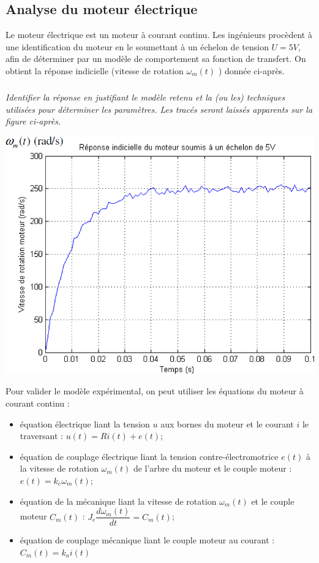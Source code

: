 \documentclass[10pt,fleqn]{article} %
\begin{document}
\begin{multicols}{2}
\subsection*{Analyse du moteur électrique}
Le moteur électrique est un moteur à courant continu. Les ingénieurs procèdent à une identification du
moteur en le soumettant à un échelon de tension $U=5V$, afin de déterminer par un modèle de
comportement sa fonction de transfert. On obtient la réponse indicielle (vitesse de rotation $\omega_m(t)$ )
donnée ci-après.

\subparagraph{}
\textit{Identifier la réponse en justifiant le modèle retenu et la (ou les) techniques utilisées pour
déterminer les paramètres. Les tracés seront laissés apparents sur la figure ci-après.}


\begin{center}
\includegraphics[width=\linewidth]{images/image2_7}
\end{center}


Pour valider le modèle expérimental, on peut utiliser les équations du moteur à courant continu :
\begin{itemize}
\item équation électrique liant la tension $u$ aux bornes du moteur et le courant $i$ le traversant :
$u(t) = Ri(t) + e(t)$;
\item équation de couplage électrique liant la tension contre-électromotrice $e(t)$ à la vitesse de
rotation $\omega_m(t)$ de l’arbre du moteur et le couple moteur : $e(t)= k_e \omega_m(t)$;
\item équation de la mécanique liant la vitesse de rotation $\omega_m(t)$  et le couple moteur $C_m(t)$ :
$J_e \dfrac{d\omega_m(t)}{dt} = C_m(t)$;
\item équation de couplage mécanique liant le couple moteur au courant : $C_m(t)=k_ai(t)$
\end{itemize}


\end{multicols}
\end{document}
